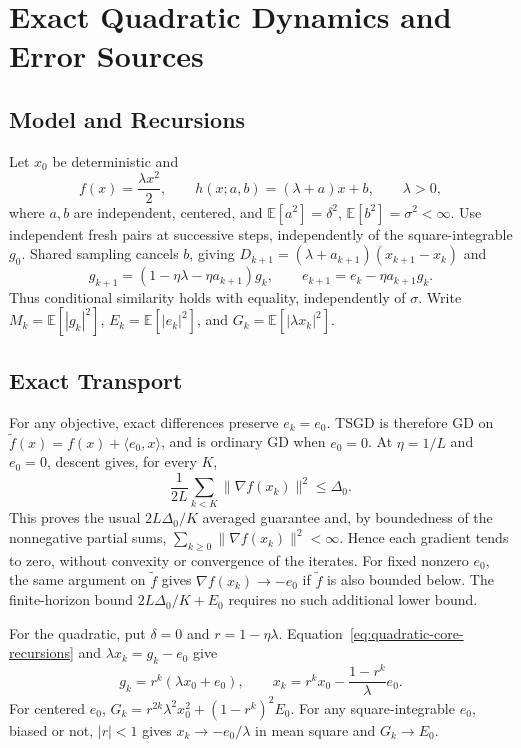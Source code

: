 \section{Exact Quadratic Dynamics and Error Sources}
\label{app:quadratic-dynamics}
\label{sec:two-error-sources}

\subsection{Model and Recursions}
\label{subsec:quadratic-model}

Let $x_0$ be deterministic and
\[
f(x)=\frac{\lambda x^2}{2},\qquad
h(x;a,b)=(\lambda+a)x+b,\qquad \lambda>0,
\]
where $a,b$ are independent, centered, and
$\mathbb E[a^2]=\delta^2$, $\mathbb E[b^2]=\sigma^2<\infty$.
Use independent fresh pairs at successive steps, independently of
the square-integrable $g_0$. Shared sampling cancels $b$, giving
$D_{k+1}=(\lambda+a_{k+1})(x_{k+1}-x_k)$ and
\begin{equation}
\label{eq:quadratic-core-recursions}
g_{k+1}=(1-\eta\lambda-\eta a_{k+1})g_k,\qquad
e_{k+1}=e_k-\eta a_{k+1}g_k.
\end{equation}
Thus conditional similarity holds with equality, independently of
$\sigma$. Write $M_k=\mathbb E[|g_k|^2]$,
$E_k=\mathbb E[|e_k|^2]$, and $G_k=\mathbb E[|\lambda x_k|^2]$.

\subsection{Exact Transport}
\label{subsec:exact-init-exact-transport}
\label{subsec:inexact-init-exact-transport}

For any objective, exact differences preserve $e_k=e_0$. TSGD is
therefore GD on $\widetilde f(x)=f(x)+\langle e_0,x\rangle$,
and is ordinary GD when $e_0=0$.
At $\eta=1/L$ and $e_0=0$, descent gives, for every $K$,
\[
\frac1{2L}\sum_{k<K}\|\nabla f(x_k)\|^2\leq\Delta_0.
\]
This proves the usual $2L\Delta_0/K$ averaged guarantee and, by
boundedness of the nonnegative partial sums,
$\sum_{k\geq0}\|\nabla f(x_k)\|^2<\infty$.
Hence each gradient tends to zero, without convexity or convergence
of the iterates. For fixed nonzero $e_0$, the same argument on
$\widetilde f$ gives $\nabla f(x_k)\to-e_0$ if $\widetilde f$ is
also bounded below. The finite-horizon bound
$2L\Delta_0/K+E_0$ requires no such additional lower bound.

For the quadratic, put $\delta=0$ and $r=1-\eta\lambda$.
Equation~\eqref{eq:quadratic-core-recursions} and
$\lambda x_k=g_k-e_0$ give
\begin{equation}
\label{eq:quadratic-tilted-trajectory}
g_k=r^k(\lambda x_0+e_0),\qquad
x_k=r^kx_0-\frac{1-r^k}{\lambda}e_0.
\end{equation}
For centered $e_0$,
$G_k=r^{2k}\lambda^2x_0^2+(1-r^k)^2E_0$.
For any square-integrable $e_0$, biased or not, $|r|<1$ gives
$x_k\to-e_0/\lambda$ in mean square and $G_k\to E_0$.

